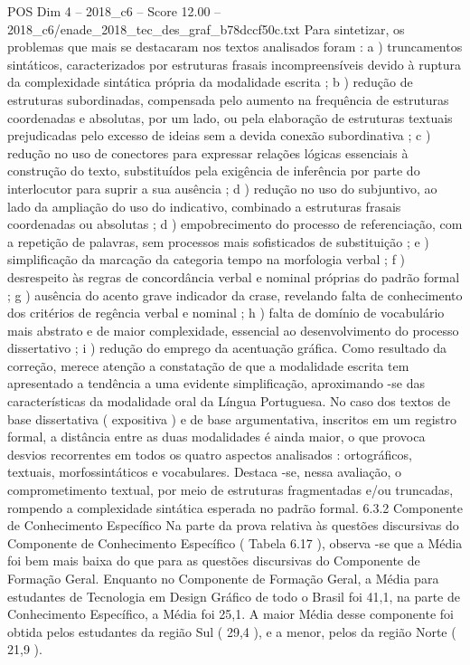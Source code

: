 \begin{textsample}{POS Dim 4 – 2018\_c6 – Score 12.00 – 2018\_c6/enade\_2018\_tec\_des\_graf\_b78dccf50c.txt}
Para sintetizar, os problemas que mais se destacaram nos textos analisados foram : a ) truncamentos sintáticos, caracterizados por estruturas frasais incompreensíveis devido à ruptura da complexidade sintática própria da modalidade escrita ; b ) redução de estruturas subordinadas, compensada pelo aumento na frequência de estruturas coordenadas e absolutas, por um lado, ou pela elaboração de estruturas textuais prejudicadas pelo excesso de ideias sem a devida conexão subordinativa ; c ) redução no uso de conectores para expressar relações lógicas essenciais à construção do texto, substituídos pela exigência de inferência por parte do interlocutor para suprir a sua ausência ; d ) redução no uso do subjuntivo, ao lado da ampliação do uso do indicativo, combinado a estruturas frasais coordenadas ou absolutas ; d ) empobrecimento do processo de referenciação, com a repetição de palavras, sem processos mais sofisticados de substituição ; e ) simplificação da marcação da categoria tempo na morfologia verbal ; f ) desrespeito às regras de concordância verbal e nominal próprias do padrão formal ; g ) ausência do acento grave indicador da crase, revelando falta de conhecimento dos critérios de regência verbal e nominal ; h ) falta de domínio de vocabulário mais abstrato e de maior complexidade, essencial ao desenvolvimento do processo dissertativo ; i ) redução do emprego da acentuação gráfica.
Como resultado da correção, merece atenção a constatação de que a modalidade escrita tem apresentado a tendência a uma evidente simplificação, aproximando -se das características da modalidade oral da Língua Portuguesa.
No caso dos textos de base dissertativa ( expositiva ) e de base argumentativa, inscritos em um registro formal, a distância entre as duas modalidades é ainda maior, o que provoca desvios recorrentes em todos os quatro aspectos analisados : ortográficos, textuais, morfossintáticos e vocabulares.
Destaca -se, nessa avaliação, o comprometimento textual, por meio de estruturas fragmentadas e/ou truncadas, rompendo a complexidade sintática esperada no padrão formal. 6.3.2 Componente de Conhecimento Específico Na parte da prova relativa às questões discursivas do Componente de Conhecimento Específico ( Tabela 6.17 ), observa -se que a Média foi bem mais baixa do que para as questões discursivas do Componente de Formação Geral.
Enquanto no Componente de Formação Geral, a Média para estudantes de Tecnologia em Design Gráfico de todo o Brasil foi 41,1, na parte de Conhecimento Específico, a Média foi 25,1.
A maior Média desse componente foi obtida pelos estudantes da região Sul ( 29,4 ), e a menor, pelos da região Norte ( 21,9 ).

\end{textsample}

